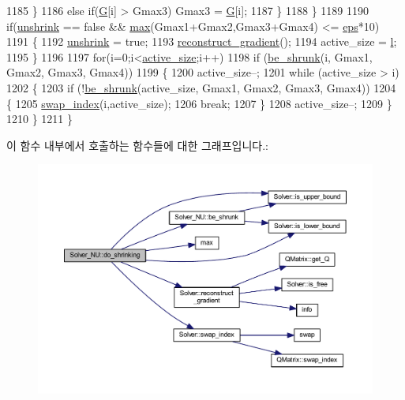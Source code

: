 \begin{DoxyCode}
1185             \}
1186             \textcolor{keywordflow}{else}    \textcolor{keywordflow}{if}(\hyperlink{class_solver_ad8ab27068f2e045591970aae1201afe9}{G}[i] > Gmax3) Gmax3 = \hyperlink{class_solver_ad8ab27068f2e045591970aae1201afe9}{G}[i];
1187         \}
1188     \}
1189 
1190     \textcolor{keywordflow}{if}(\hyperlink{class_solver_a62ded1c184aeb28f8dee04eb4a10530a}{unshrink} == \textcolor{keyword}{false} && \hyperlink{svm_8cpp_a7cba98555a7346b01e4cc06205527d8a}{max}(Gmax1+Gmax2,Gmax3+Gmax4) <= \hyperlink{class_solver_a718333cc2c1d40abf9c292a788cba1e5}{eps}*10) 
1191     \{
1192         \hyperlink{class_solver_a62ded1c184aeb28f8dee04eb4a10530a}{unshrink} = \textcolor{keyword}{true};
1193         \hyperlink{class_solver_a7e34992ede606a336606ae54f6e963e6}{reconstruct\_gradient}();
1194         active\_size = \hyperlink{class_solver_a88832d45b6de977b1cbb2afd4c0e494c}{l};
1195     \}
1196 
1197     \textcolor{keywordflow}{for}(i=0;i<\hyperlink{class_solver_a06ba1b87b3749cc545e573151b7beca0}{active\_size};i++)
1198         \textcolor{keywordflow}{if} (\hyperlink{class_solver___n_u_ab22738c68164e939d7d0d5de5a5b15f3}{be\_shrunk}(i, Gmax1, Gmax2, Gmax3, Gmax4))
1199         \{
1200             active\_size--;
1201             \textcolor{keywordflow}{while} (active\_size > i)
1202             \{
1203                 \textcolor{keywordflow}{if} (!\hyperlink{class_solver___n_u_ab22738c68164e939d7d0d5de5a5b15f3}{be\_shrunk}(active\_size, Gmax1, Gmax2, Gmax3, Gmax4))
1204                 \{
1205                     \hyperlink{class_solver_a043f498c1dda0122859d03f9cd07dc08}{swap\_index}(i,active\_size);
1206                     \textcolor{keywordflow}{break};
1207                 \}
1208                 active\_size--;
1209             \}
1210         \}
1211 \}
\end{DoxyCode}


이 함수 내부에서 호출하는 함수들에 대한 그래프입니다.\+:
\nopagebreak
\begin{figure}[H]
\begin{center}
\leavevmode
\includegraphics[width=350pt]{class_solver___n_u_a6670a539940f4efdc40d2c9e75a9da1b_cgraph}
\end{center}
\end{figure}


